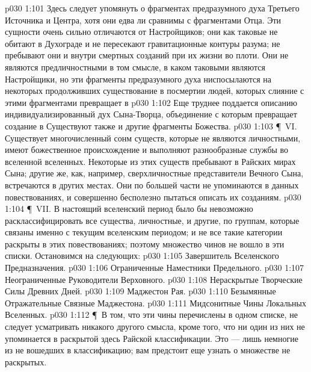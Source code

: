 \vs p030 1:101 Здесь следует упомянуть о фрагментах предразумного духа Третьего Источника и Центра, хотя они едва ли сравнимы с фрагментами Отца. Эти сущности очень сильно отличаются от Настройщиков; они как таковые не обитают в Духограде и не пересекают гравитационные контуры разума; не пребывают они и внутри смертных созданий при их жизни во плоти. Они не являются предличностными в том смысле, в каком таковыми являются Настройщики, но эти фрагменты предразумного духа ниспосылаются на некоторых продолживших существование в посмертии людей, которых слияние с этими фрагментами превращает в 
\vs p030 1:102 Еще труднее поддается описанию индивидуализированный дух Сына\hyp{}Творца, объединение с которым превращает создание в  Существуют также и другие фрагменты Божества.
\vs p030 1:103 \P\ VI.  Существует многочисленный сонм существ, которые не являются личностными, имеют божественное происхождение и выполняют разнообразные службы во вселенной вселенных. Некоторые из этих существ пребывают в Райских мирах Сына; другие же, как, например, сверхличностные представители Вечного Сына, встречаются в других местах. Они по большей части не упоминаются в данных повествованиях, и совершенно бесполезно пытаться описать их  созданиям.
\vs p030 1:104 \P\ VII.   В настоящий вселенский период было бы невозможно расклассифицировать все существа, личностные, и другие, по группам, которые связаны именно с текущим вселенским периодом; и не все такие категории раскрыты в этих повествованиях; поэтому множество чинов не вошло в эти списки. Остановимся на следующих:
\vs p030 1:105 Завершитель Вселенского Предназначения.
\vs p030 1:106 Ограниченные Наместники Предельного.
\vs p030 1:107 Неограниченные Руководители Верховного.
\vs p030 1:108 Нераскрытые Творческие Силы Древних Дней.
\vs p030 1:109 Маджестон Рая.
\vs p030 1:110 Безымянные Отражательные Связные Маджестона.
\vs p030 1:111 Мидсонитные Чины Локальных Вселенных.
\vs p030 1:112 \P\ В том, что эти чины перечислены в одном списке, не следует усматривать никакого другого смысла, кроме того, что ни один из них не упоминается в раскрытой здесь Райской классификации. Это --- лишь немногие из не вошедших в классификацию; вам предстоит еще узнать о множестве не раскрытых.
